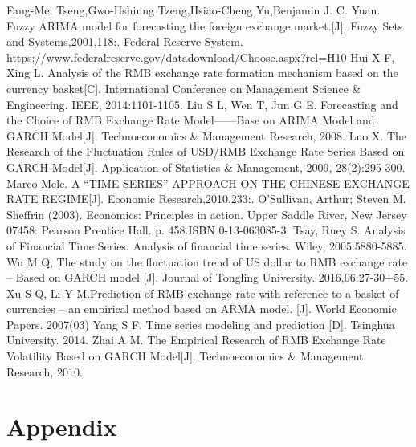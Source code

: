 \documentclass[12pt, a4paper, titlepage]{article}
\begin{document}
\begin{thebibliography}{9}
\bibitem  Fang-Mei Tseng,Gwo-Hshiung Tzeng,Hsiao-Cheng Yu,Benjamin J. C. Yuan. Fuzzy ARIMA model for forecasting the foreign exchange market.[J]. Fuzzy Sets and Systems,2001,118:.
\bibitem  Federal Reserve System. https://www.federalreserve.gov/datadownload/Choose.aspx?rel=H10 
\bibitem  Hui X F, Xing L. Analysis of the RMB exchange rate formation mechanism based on the currency basket[C]. International Conference on Management Science \& Engineering. IEEE, 2014:1101-1105. 
\bibitem  Liu S L, Wen T, Jun G E. Forecasting and the Choice of RMB Exchange Rate Model——Base on ARIMA Model and GARCH Model[J]. Technoeconomics \& Management Research, 2008.
\bibitem  Luo X. The Research of the Fluctuation Rules of USD/RMB Exchange Rate Series Based on GARCH Model[J]. Application of Statistics \& Management, 2009, 28(2):295-300.
\bibitem  Marco Mele. A “TIME SERIES” APPROACH ON THE CHINESE EXCHANGE RATE REGIME[J]. Economic Research,2010,233:.
\bibitem  O'Sullivan, Arthur; Steven M. Sheffrin (2003). Economics: Principles in action. Upper Saddle River, New Jersey 07458: Pearson Prentice Hall. p. 458.ISBN 0-13-063085-3. 
\bibitem  Tsay, Ruey S. Analysis of Financial Time Series. Analysis of financial time series. Wiley, 2005:5880-5885.
\bibitem  Wu M Q, The study on the fluctuation trend of US dollar to RMB exchange rate -- Based on GARCH model [J]. Journal of Tongling University. 2016,06:27-30+55.
\bibitem  Xu S Q, Li Y M.Prediction of RMB exchange rate with reference to a basket of currencies -- an empirical method based on ARMA model. [J]. World Economic Papers. 2007(03)
\bibitem  Yang S F. Time series modeling and prediction [D]. Tsinghua University. 2014.
\bibitem  Zhai A M. The Empirical Research of RMB Exchange Rate Volatility Based on GARCH Model[J]. Technoeconomics \& Management Research, 2010.
\end{thebibliography}

\section{Appendix}
\end{document}
